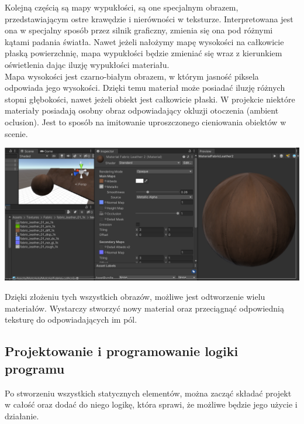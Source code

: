 \documentclass{article} %
\begin{document}
            Kolejną częścią są mapy wypukłości, są one specjalnym obrazem, przedstawiającym ostre krawędzie i nierówności w teksturze. Interpretowana jest ona w specjalny sposób przez silnik graficzny, zmienia się ona pod różnymi kątami padania światła. Nawet jeżeli nałożymy mapę wysokości na całkowicie płaską powierzchnię, mapa wypukłości będzie zmieniać się wraz z kierunkiem oświetlenia dając iluzję wypukłości materiału.
            \\
            
            Mapa wysokości jest czarno-białym obrazem, w którym jasność piksela odpowiada jego wysokości. Dzięki temu materiał może posiadać iluzję różnych stopni głębokości, nawet jeżeli obiekt jest całkowicie płaski. W projekcie niektóre materiały posiadają osobny obraz odpowiadający okluzji otoczenia (ambient oclusion). Jest to sposób na imitowanie uproszczonego cieniowania obiektów w scenie.
            \\
            
            
            \begin{center}
            \includegraphics[scale=0.4,keepaspectratio=true]{images/screenshots/work/8-tworzenie-materialow_000.png}
            \end{center}

            
            Dzięki złożeniu tych wszystkich obrazów, możliwe jest odtworzenie wielu materiałów. Wystarczy stworzyć nowy materiał oraz przeciągnąć odpowiednią teksturę do odpowiadających im pól. 
            \\

            
    \subsection{Projektowanie i programowanie logiki programu}
        Po stworzeniu wszystkich statycznych elementów, można zacząć składać projekt w całość oraz dodać do niego logikę, która sprawi, że możliwe będzie jego użycie i działanie.
        \\
    
\end{document}
